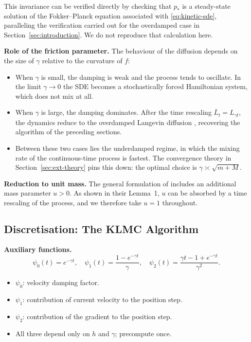 \documentclass[a4paper,11pt, titlepage]{article}
\theoremstyle{definition}
\theoremstyle{plain}
\theoremstyle{remark}
\begin{document}
This invariance can be verified directly by checking that $p_*$ is a
steady-state solution of the Fokker--Planck equation associated with
\eqref{eq:kinetic-sde}, paralleling the verification carried out for the
overdamped case in Section~\ref{sec:introduction}. We do not reproduce that
calculation here.

\textbf{Role of the friction parameter.}
The behaviour of the diffusion depends on the size of $\gamma$ relative to the curvature of $f$:
\begin{itemize}
    \item When $\gamma$ is small, the damping is weak and the process tends to oscillate. In the limit $\gamma \to 0$ the SDE becomes a stochastically forced Hamiltonian system, which does not mix at all.
    \item When $\gamma$ is large, the damping dominates. After the time rescaling $\bar{L}_t = L_{\gamma t}$, the dynamics reduce to the overdamped Langevin diffusion \citep[Theorem~10.1]{Nelson1967}, recovering the algorithm of the preceding sections.
    \item Between these two cases lies the underdamped regime, in which the mixing rate of the continuous-time process is fastest. The convergence theory in Section~\ref{sec:ext-theory} pins this down: the optimal choice is $\gamma \asymp \sqrt{m+M}$.
\end{itemize}

\textbf{Reduction to unit mass.}
The general formulation of \citet{DalalyanRiouDurand2020} includes an additional mass parameter $u > 0$. As shown in their Lemma~1, $u$ can be absorbed by a time rescaling of the process, and we therefore take $u = 1$ throughout.

\subsection{Discretisation: The KLMC Algorithm}
\label{sec:ext-klmc-algo}

\textbf{Auxiliary functions.}
\begin{equation}
\psi_0(t) = e^{-\gamma t},
\quad
\psi_1(t) = \frac{1 - e^{-\gamma t}}{\gamma},
\quad
\psi_2(t) = \frac{\gamma t - 1 + e^{-\gamma t}}{\gamma^2}.
\label{eq:psi-functions}
\end{equation}
\begin{itemize}
    \item $\psi_0$: velocity damping factor.
    \item $\psi_1$: contribution of current velocity to the position step.
    \item $\psi_2$: contribution of the gradient to the position step.
    \item All three depend only on $h$ and $\gamma$; precompute once.
\end{itemize}
\end{document}

